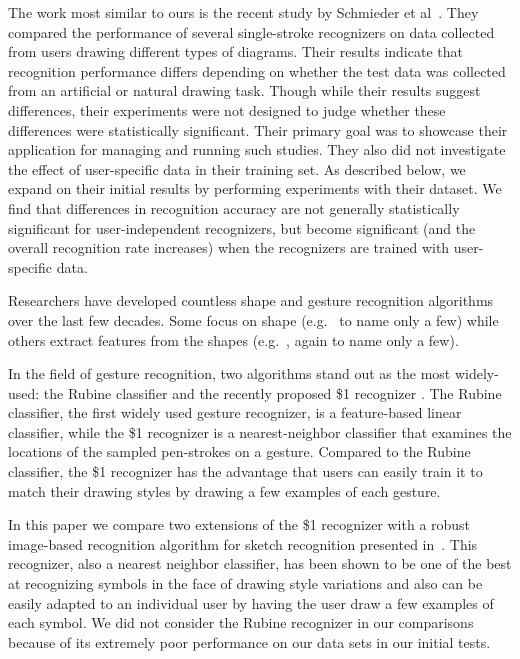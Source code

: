 \documentclass[final,5p,twocolumn]{elsarticle}
\begin{document}
The work most similar to ours is the recent
study by Schmieder et al~\cite{schmieder09}.
They compared the performance of several single-stroke recognizers
on data collected from users drawing different types of diagrams.  Their results indicate 
that recognition performance differs depending on whether the test data was collected 
from an artificial or natural drawing task.  
Though while their results suggest differences, their experiments were not
designed to judge whether these differences were statistically significant.  
Their primary goal was to showcase their application for managing and running such studies.  They 
also did not investigate the effect of user-specific data in their training set.
As described below, we expand on their initial results by performing experiments with their dataset.
We find that differences in recognition accuracy are not generally 
statistically significant for user-independent
recognizers, but become significant (and the overall recognition rate 
increases) when the recognizers are trained with user-specific data.

  
Researchers have developed countless shape and gesture recognition
algorithms over the last few decades.  Some focus on shape
(e.g.~
\cite{hammond04,alvarado04,learned06,kara05,wobbrock07}
to name only a few) while others extract features from the shapes
(e.g.~\cite{blagojevic08,hse04,rubine91,fonseca02,lee06},
again to name only a few).  

In the field of gesture recognition, two
algorithms stand out as the most widely-used: the Rubine classifier \cite{rubine91}
and the recently proposed \$1 recognizer \cite{wobbrock07}.  The Rubine classifier, the
first widely used gesture recognizer, is a feature-based linear
classifier, while the \$1 recognizer is a nearest-neighbor classifier
that examines the locations of the sampled pen-strokes on a gesture.  
Compared to the Rubine classifier,
the \$1 recognizer has the advantage that users can easily train it to
match their drawing styles by drawing a few examples of each gesture.

In this paper we compare two extensions of the \$1 recognizer with a
robust image-based recognition algorithm for sketch recognition
presented in~\cite{kara05}.  This recognizer, also a
nearest neighbor classifier, has been shown to be one of the best at
recognizing symbols in the face of drawing style variations and also
can be easily adapted to an individual user by having the user draw a
few examples of each symbol.  We did not consider the Rubine recognizer
in our comparisons because of its extremely poor performance on 
our data sets in our initial tests.  
\end{document}
